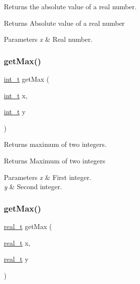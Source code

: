 Returns the absolute value of a real number. \begin{DoxyReturn}{Returns}
Absolute value of a real number 
\end{DoxyReturn}

\begin{DoxyParams}{Parameters}
{\em x} & Real number. \\
\hline
\end{DoxyParams}
\mbox{\label{_utils_8ipp_a831cbfe8455d9b992e5a05a9bae93e6b}} 
\subsubsection{\texorpdfstring{get\+Max()}{getMax()}\hspace{0.1cm}{\footnotesize\ttfamily [1/2]}}
{\footnotesize\ttfamily \hyperlink{_types_8hpp_ab6fd6105e64ed14a0c9281326f05e623}{int\+\_\+t} get\+Max (\begin{DoxyParamCaption}\item[{\hyperlink{_types_8hpp_ab6fd6105e64ed14a0c9281326f05e623}{int\+\_\+t}}]{x,  }\item[{\hyperlink{_types_8hpp_ab6fd6105e64ed14a0c9281326f05e623}{int\+\_\+t}}]{y }\end{DoxyParamCaption})\hspace{0.3cm}{\ttfamily [inline]}}

Returns maximum of two integers. \begin{DoxyReturn}{Returns}
Maximum of two integers 
\end{DoxyReturn}

\begin{DoxyParams}{Parameters}
{\em x} & First integer. \\
\hline
{\em y} & Second integer. \\
\hline
\end{DoxyParams}
\mbox{\label{_utils_8ipp_a8fdffff19505aed691eeca46c8c20fe6}} 
\subsubsection{\texorpdfstring{get\+Max()}{getMax()}\hspace{0.1cm}{\footnotesize\ttfamily [2/2]}}
{\footnotesize\ttfamily \hyperlink{qp_o_a_s_e_s__wrapper_8h_a0d00e2b3dfadee81331bbb39068570c4}{real\+\_\+t} get\+Max (\begin{DoxyParamCaption}\item[{\hyperlink{qp_o_a_s_e_s__wrapper_8h_a0d00e2b3dfadee81331bbb39068570c4}{real\+\_\+t}}]{x,  }\item[{\hyperlink{qp_o_a_s_e_s__wrapper_8h_a0d00e2b3dfadee81331bbb39068570c4}{real\+\_\+t}}]{y }\end{DoxyParamCaption})\hspace{0.3cm}{\ttfamily [inline]}}

